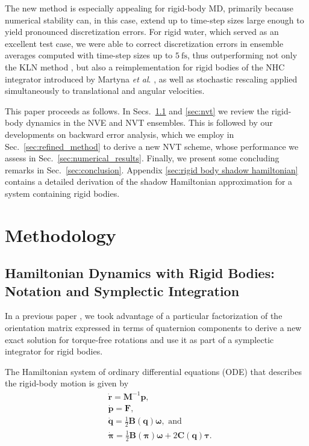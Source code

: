 \documentclass[
	aip,
	jcp,
	reprint,
]{revtex4-1}
\newcommand{\mt}[1]{\boldsymbol{\mathbf{#1}}}          %
\newcommand{\vt}[1]{\boldsymbol{\mathbf{#1}}}          %
\newcommand{\diff}[2]{\frac{\partial #1}{\partial #2}} %
\newcommand{\Ham}[1]{{\mathcal H}_\text{#1}}           %
\begin{document}
The new method is especially appealing for rigid-body MD, primarily because numerical stability can, in this case, extend up to time-step sizes large enough to yield pronounced discretization errors.
For rigid water, which served as an excellent test case, we were able to correct discretization errors in ensemble averages computed with time-step sizes up to $5~\text{fs}$, thus outperforming not only the KLN method \cite{Kamberaj_2005}, but also a reimplementation for rigid bodies of the NHC integrator introduced by Martyna \textit{et al}. \cite{Martyna_1996}, as well as stochastic rescaling \cite{Bussi_2007} applied simultaneously to translational and angular velocities.

This paper proceeds as follows.
In Secs.~\ref{sec:nve} and \ref{sec:nvt} we review the rigid-body dynamics in the NVE and NVT ensembles.
This is followed by our developments on backward error analysis, which we employ in Sec.~\ref{sec:refined_method} to derive a new NVT scheme, whose performance we assess in Sec.~\ref{sec:numerical_results}.
Finally, we present some concluding remarks in Sec.~\ref{sec:conclusion}. Appendix \ref{sec:rigid body shadow hamiltonian} contains a detailed derivation of the shadow Hamiltonian approximation for a system containing rigid bodies.

\section{Methodology}
\label{sec:methodology}

\subsection{Hamiltonian Dynamics with Rigid Bodies: Notation and Symplectic Integration}
\label{sec:nve}

In a previous paper \cite{Silveira_2017}, we took advantage of a particular factorization of the orientation matrix expressed in terms of quaternion components to derive a new exact solution for torque-free rotations and use it as part of a symplectic integrator for rigid bodies.

The Hamiltonian system of ordinary differential equations (ODE) that describes the rigid-body motion is given by \cite{Silveira_2017}
\begin{subequations}
	\label{eq:ODE system for NVE}
	\begin{align}
%
	&\dot{\vt r} =
	{\mt M}^{-1} {\vt p}, \\
%
	&\dot{\vt p} =
	{\vt F}, \\
%
	&\dot{\vt q} =
	\frac{1}{2} \mt B(\vt q) \vt \omega, \text{ and} \label{eq:EDO_q} \\
%
	&\dot{\vt \pi} =
	\frac{1}{2} \mt B(\vt \pi) \vt \omega + 2 \mt C(\vt q) \vt \tau. \label{eq:EDO_pi}
	\end{align}
\end{subequations}
\end{document}
